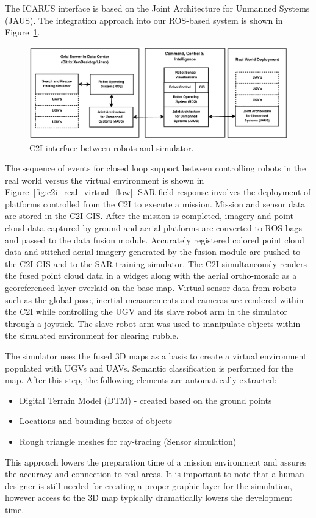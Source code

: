 \documentclass{article}
\begin{document}
The ICARUS interface is based on the Joint Architecture for Unmanned Systems (JAUS).
The integration approach into our ROS-based system is shown in Figure~\ref{fig:c2i_robot_sim_interface}.
\begin{figure} [h]
    \centering
    \includegraphics[width=\textwidth]{ROB-15-0035_fig12.eps}
    \caption{C2I interface between robots and simulator.}
    \label{fig:c2i_robot_sim_interface}
\end{figure}
The sequence of events for closed loop support between controlling robots in the real world versus the virtual environment is shown in Figure~\ref{fig:c2i_real_virtual_flow}.
SAR field response involves the deployment of platforms controlled from the C2I to execute a mission. Mission and sensor data are stored in the C2I GIS.
After the mission is completed, imagery and point cloud data captured by ground and aerial platforms are converted to ROS bags and passed to the data fusion module.
Accurately registered colored point cloud data and stitched aerial imagery generated by the fusion module are pushed to the C2I GIS and to the SAR training simulator.
The C2I simultaneously renders the fused point cloud data in a widget along with the aerial ortho-mosaic as a georeferenced layer overlaid on the base map.
Virtual sensor data from robots such as the global pose, inertial measurements and cameras are rendered within the C2I while controlling the UGV and its slave robot arm in the simulator through a joystick.
The slave robot arm was used to manipulate objects within the simulated environment for clearing rubble.

The simulator uses the fused 3D maps as a basis to create a virtual environment populated with UGVs and UAVs. Semantic classification is performed for the map. After this step, the following elements are automatically extracted:
\begin{itemize}
\item Digital Terrain Model (DTM) - created based on the ground points
\item Locations and bounding boxes of objects
\item Rough triangle meshes for ray-tracing (Sensor simulation)
\end{itemize}
This approach lowers the preparation time of a mission environment and assures the accuracy and connection to real areas. It is important to note that a human designer is still needed for creating a proper graphic layer for the simulation, however access to the 3D map typically dramatically lowers the development time.
\end{document}
